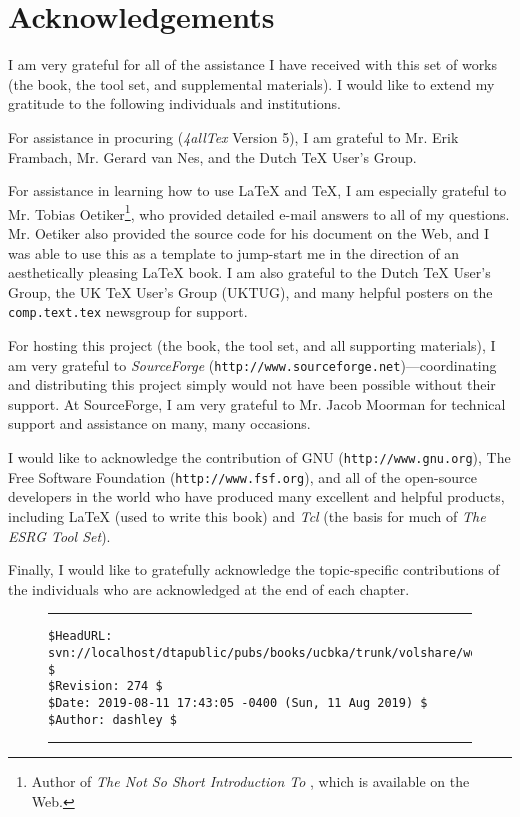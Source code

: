 \chapter{Acknowledgements}

I am very grateful for all
of the assistance I have received with this set of works (the book,
the tool set, and supplemental materials).  I would
like to extend my gratitude to the following individuals
and institutions.

For assistance in procuring \LaTeXe{} (\emph{4allTex} Version 5), I am
grateful to Mr. Erik Frambach, Mr. Gerard van Nes, and the Dutch
\TeX{} User's Group.

For assistance in learning how to use \LaTeX{} and \TeX{}, I am
especially grateful to Mr. Tobias Oetiker\footnote{Author of
\emph{The Not So Short Introduction To \LaTeXe{}}, which is
available on the Web.},
who provided detailed e-mail answers to all of
my questions.  Mr. Oetiker also provided the source code for his
document on the Web, and I was able to use this as a template to
jump-start me in the direction of an aesthetically pleasing
\LaTeX{} book.  I am also grateful to the Dutch \TeX{}
User's Group, the UK \TeX{}
User's Group (UKTUG), and many helpful posters on the 
\texttt{comp.text.tex} newsgroup
\cite{bibref:n:comptexttex} for support.

For hosting this project (the book, the tool set, and all supporting
materials), I am very grateful to \emph{SourceForge}
(\texttt{http://www.sourceforge.net})---coordinating and 
distributing this project simply would not have been possible without
their support.  At SourceForge, I am very grateful to Mr.
Jacob Moorman for technical support and assistance on many,
many occasions.

I would like to acknowledge the contribution of GNU 
(\texttt{http://www.gnu.org}), 
The Free Software Foundation 
(\texttt{http://www.fsf.org}), and all of the open-source
developers in the world who have produced many excellent and
helpful products, including
\LaTeX{} (used to write this book) and 
\emph{Tcl} (the basis
for much of \emph{The ESRG Tool Set}).

Finally, I would like to gratefully acknowledge the
topic-specific contributions of the individuals who are
acknowledged at the end of each chapter.

\begin{figure}[b]
\noindent\rule[-0.25in]{\textwidth}{1pt}
\begin{tiny}
\begin{verbatim}
$HeadURL: svn://localhost/dtapublic/pubs/books/ucbka/trunk/volshare/workacks.tex $
$Revision: 274 $
$Date: 2019-08-11 17:43:05 -0400 (Sun, 11 Aug 2019) $
$Author: dashley $
\end{verbatim}
\end{tiny}
\noindent\rule[0.25in]{\textwidth}{1pt}
\end{figure}

%
